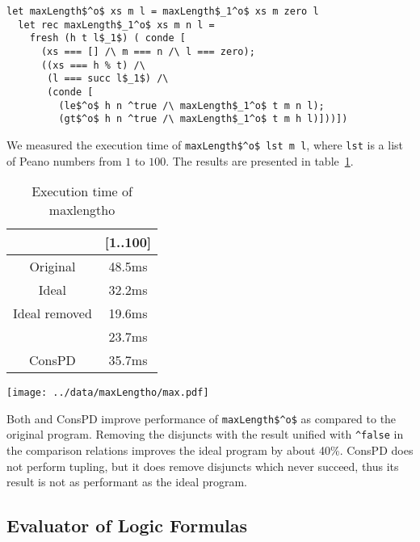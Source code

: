 \begin{figure*}[!h]
  \centering
  \begin{minipage}{0.7\textwidth}
\begin{lstlisting}[label={ideal:maxandlength}, caption={Ideal implementation of maxlengtho}, captionpos=b, frame=tb]
  let maxLength$^o$ xs m l = maxLength$_1^o$ xs m zero l
  let rec maxLength$_1^o$ xs m n l =
    fresh (h t l$_1$) ( conde [
      (xs === [] /\ m === n /\ l === zero);
      ((xs === h % t) /\
       (l === succ l$_1$) /\
       (conde [
         (le$^o$ h n ^true /\ maxLength$_1^o$ t m n l);
         (gt$^o$ h n ^true /\ maxLength$_1^o$ t m h l)]))])
  \end{lstlisting}
\end{minipage}
\end{figure*}

We measured the execution time of \lstinline{maxLength$^o$ lst m l}, where \lstinline{lst} is a list of Peano numbers from $1$ to $100$.
The results are presented in table~\ref{tbl:maxlen}.


\begin{table}
  \centering
  \begin{tabular}{c||c}
                   & [1..100] \\ \hline\hline
  Original         & 48.5ms  \\ \hline
  Ideal            & 32.2ms  \\ \hline
  Ideal removed    & 19.6ms  \\ \hline
  \ecce            & 23.7ms  \\ \hline
  ConsPD          & 35.7ms
  \end{tabular}

  \caption{Execution time of maxlengtho}
  \label{tbl:maxlen}
\end{table}

\texttt{[image: ../data/maxLengtho/max.pdf]}

Both \ecce and ConsPD improve performance of \lstinline{maxLength$^o$} as compared to the original program.
Removing the disjuncts with the result unified with \lstinline{^false} in the comparison relations improves the ideal program by about 40\%.
ConsPD does not perform tupling, but it does remove disjuncts which never succeed, thus its result is not as performant as the ideal program.


\subsection{Evaluator of Logic Formulas}

